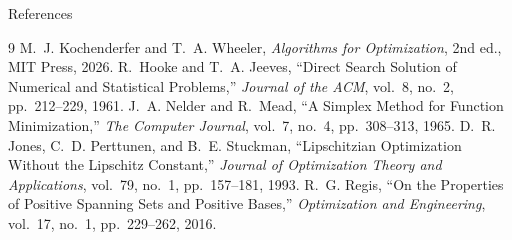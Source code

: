 \documentclass[aspectratio=169,10pt]{beamer}
\begin{document}
\begin{frame}{References}
  \begin{thebibliography}{9}
      M.~J. Kochenderfer and T.~A. Wheeler,
      \emph{Algorithms for Optimization}, 2nd ed.,
      MIT Press, 2026.
      R.~Hooke and T.~A. Jeeves,
      ``Direct Search Solution of Numerical and Statistical
      Problems,''
      \emph{Journal of the ACM}, vol.~8, no.~2, pp.~212--229, 1961.
      J.~A. Nelder and R.~Mead,
      ``A Simplex Method for Function Minimization,''
      \emph{The Computer Journal}, vol.~7, no.~4,
      pp.~308--313, 1965.
      D.~R. Jones, C.~D. Perttunen, and B.~E. Stuckman,
      ``Lipschitzian Optimization Without the Lipschitz Constant,''
      \emph{Journal of Optimization Theory and Applications},
      vol.~79, no.~1, pp.~157--181, 1993.
      R.~G. Regis,
      ``On the Properties of Positive Spanning Sets and Positive
      Bases,''
      \emph{Optimization and Engineering}, vol.~17, no.~1,
      pp.~229--262, 2016.
  \end{thebibliography}
\end{frame}

\end{document}
